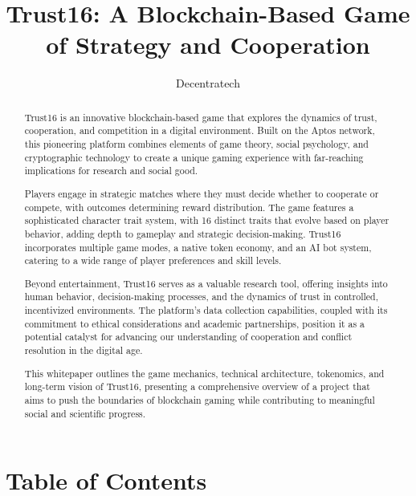 \documentclass[]{article}
\begin{document}
\title{Trust16: A Blockchain-Based Game of Strategy and
Cooperation}
\author{Decentratech}
\maketitle

\begin{abstract}
Trust16 is an innovative blockchain-based game that explores the dynamics of trust, cooperation, and competition in a digital environment. Built on the Aptos network, this pioneering platform combines elements of game theory, social psychology, and cryptographic technology to create a unique gaming experience with far-reaching implications for research and social good.

Players engage in strategic matches where they must decide whether to cooperate or compete, with outcomes determining reward distribution. The game features a sophisticated character trait system, with 16 distinct traits that evolve based on player behavior, adding depth to gameplay and strategic decision-making. Trust16 incorporates multiple game modes, a native token economy, and an AI bot system, catering to a wide range of player preferences and skill levels.

Beyond entertainment, Trust16 serves as a valuable research tool, offering insights into human behavior, decision-making processes, and the dynamics of trust in controlled, incentivized environments. The platform's data collection capabilities, coupled with its commitment to ethical considerations and academic partnerships, position it as a potential catalyst for advancing our understanding of cooperation and conflict resolution in the digital age.

This whitepaper outlines the game mechanics, technical architecture, tokenomics, and long-term vision of Trust16, presenting a comprehensive overview of a project that aims to push the boundaries of blockchain gaming while contributing to meaningful social and scientific progress.
\end{abstract}

\hypertarget{table-of-contents}{%
\section{Table of Contents}\label{table-of-contents}}
\end{document}
